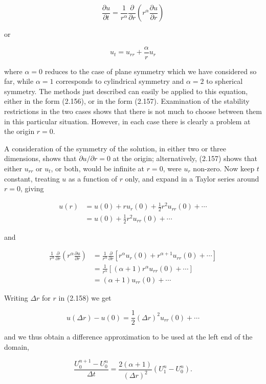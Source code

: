 \documentclass[10pt]{article}
\begin{document}
\[
\frac{\partial u}{\partial t}=\frac{1}{r^{\alpha}} \frac{\partial}{\partial r}\left(r^{\alpha} \frac{\partial u}{\partial r}\right)
\]

or

\[
u_{t}=u_{r r}+\frac{\alpha}{r} u_{r}
\]

where \(\alpha=0\) reduces to the case of plane symmetry which we have considered so far, while \(\alpha=1\) corresponds to cylindrical symmetry and \(\alpha=2\) to spherical symmetry. The methods just described can easily be applied to this equation, either in the form (2.156), or in the form (2.157). Examination of the stability restrictions in the two cases shows that there is not much to choose between them in this particular situation. However, in each case there is clearly a problem at the origin \(r=0\).

A consideration of the symmetry of the solution, in either two or three dimensions, shows that \(\partial u / \partial r=0\) at the origin; alternatively, (2.157) shows that either \(u_{r r}\) or \(u_{t}\), or both, would be infinite at \(r=0\), were \(u_{r}\) non-zero. Now keep \(t\) constant, treating \(u\) as a function of \(r\) only, and expand in a Taylor series around \(r=0\), giving

\[
\begin{aligned}
u(r) & =u(0)+r u_{r}(0)+\frac{1}{2} r^{2} u_{r r}(0)+\cdots \\
& =u(0)+\frac{1}{2} r^{2} u_{r r}(0)+\cdots
\end{aligned}
\]

and

\[
\begin{aligned}
\frac{1}{r^{\alpha}} \frac{\partial}{\partial r}\left(r^{\alpha} \frac{\partial u}{\partial r}\right) & =\frac{1}{r^{\alpha}} \frac{\partial}{\partial r}\left[r^{\alpha} u_{r}(0)+r^{\alpha+1} u_{r r}(0)+\cdots\right] \\
& =\frac{1}{r^{\alpha}}\left[(\alpha+1) r^{\alpha} u_{r r}(0)+\cdots\right] \\
& =(\alpha+1) u_{r r}(0)+\cdots
\end{aligned}
\]

Writing \(\Delta r\) for \(r\) in (2.158) we get

\[
u(\Delta r)-u(0)=\frac{1}{2}(\Delta r)^{2} u_{r r}(0)+\cdots
\]

and we thus obtain a difference approximation to be used at the left end of the domain,

\[
\frac{U_{0}^{n+1}-U_{0}^{n}}{\Delta t}=\frac{2(\alpha+1)}{(\Delta r)^{2}}\left(U_{1}^{n}-U_{0}^{n}\right) .
\]
\end{document}
